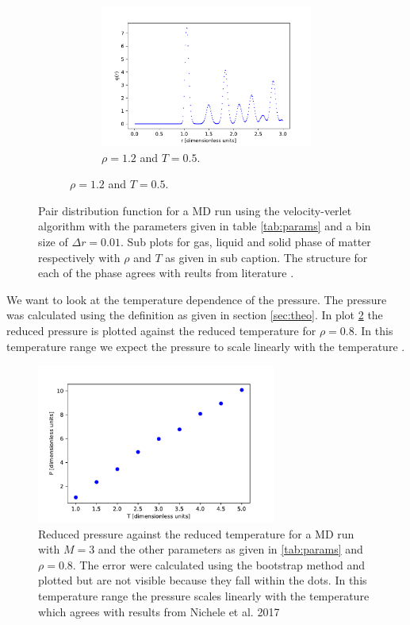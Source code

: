 \documentclass[10 pt, a4paper]{article}
\begin{document}
\begin{figure}[H]
\begin{subfigure}[b]{0.33\textwidth}
\begin{figure}[H]
\includegraphics[width=\textwidth]{pdfsol}
\caption{$\rho = 1.2$ and $T = 0.5$.}
\end{figure}
\end{subfigure}
\caption{Pair distribution function for a MD run using the velocity-verlet algorithm with the parameters given in table \ref{tab:params} and a bin size of $\Delta r = 0.01$. Sub plots for gas, liquid and solid phase of matter respectively with $\rho$ and $T$ as given in sub caption. The structure for each of the phase agrees with reults from literature \cite{pdf}.}
\label{fig:PDF}
\end{figure}

We want to look at the temperature dependence of the pressure. The pressure was calculated using the definition as given in section \ref{sec:theo}. In plot \ref{fig:pressure} the reduced pressure is plotted against the reduced temperature for $\rho = 0.8$. In this temperature  range we expect the pressure to scale linearly with the temperature \cite{obser}.

\begin{figure}[H]
\centering
\includegraphics[width=0.7\textwidth]{pressure}
\caption{Reduced pressure against the reduced temperature for a MD run with $M = 3$ and the other parameters as given in \ref{tab:params} and $\rho = 0.8$. The error were calculated using the bootstrap method and plotted but are not visible because they fall within the dots. In this temperature range the pressure scales linearly with the temperature which agrees with results from Nichele et al. 2017 \cite{obser}}
\label{fig:pressure}
\end{figure}
\end{document}
